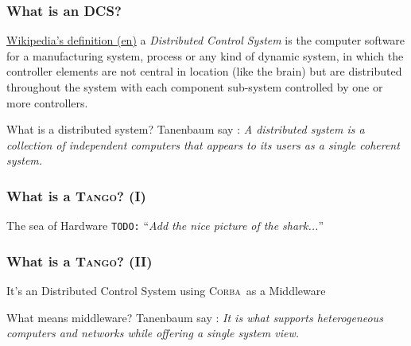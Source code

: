 \documentclass{beamer}
\newcommand{\tango}{\textsc{Tango}}
\newcommand{\corba}{\textsc{Corba}}
\newcommand{\todo}[1]{\texttt{\color{red}TODO:} ``\emph{#1}''}
\begin{document}
\begin{frame}
\frametitle{What is an DCS?}
    \begin{block}{\href{http://en.wikipedia.org/wiki/Distributed_control_system}{Wikipedia's definition (en)}}
        a \emph{Distributed Control System} is the computer software for a manufacturing system, process or any kind of dynamic system, in which the controller elements are not central in location (like the brain) but are distributed throughout the system with each component sub-system controlled by one or more controllers.
    \end{block}
    \begin{block}{What is a distributed system?}
        Tanenbaum say \cite{TanenbaumDistr}: \emph{A distributed system is a collection of independent computers that appears to its users as a single coherent system.}
    \end{block}
\end{frame}

\begin{frame}
\frametitle{What is a \tango? (I)}
    \begin{block}{The sea of Hardware}
        \todo{Add the nice picture of the shark...}
    \end{block}
\end{frame}

\begin{frame}
\frametitle{What is a \tango? (II)}
    \begin{block}{It's an Distributed Control System}
          using \corba\, as a Middleware
    \end{block}
    \begin{block}{What means middleware?}
        Tanenbaum say \cite{TanenbaumDistr}: \emph{It is what supports heterogeneous computers and networks while offering a single system view.}
    \end{block}
\end{frame}
\end{document}
